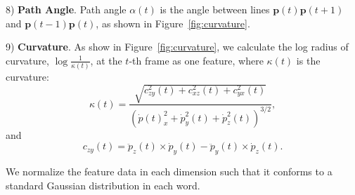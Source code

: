 8) \textbf{Path Angle}.
Path angle $\alpha(t)$ is the angle between lines $\textbf{p}(t)\textbf{p}(t+1)$ and $\textbf{p}(t-1)\textbf{p}(t)$,
as shown in  Figure~\ref{fig:curvature}.


9) \textbf{Curvature}. As show in Figure~\ref{fig:curvature},
we calculate the log radius of curvature,  $\log \frac{1}{\kappa(t)}$, at the $t$-th frame as one feature,  where $\kappa(t)$ is the curvature:
\vspace{-0mm}
$$
\kappa(t)=\frac{\sqrt{c_{zy}^{2}(t)+c_{xz}^{2}(t)+c_{yx}^{2}(t)}}{({\dot{p}}(t)_x^{2}+{\dot{p}}_y^{2}(t)+{\dot{p}}_z^{2}(t))^{3/2}}, $$
and
$$c_{zy}(t) = {\ddot{p}}_z(t) \times {\dot{p}}_y(t)-{\ddot{p}}_y(t) \times {\dot{p}}_z(t). $$


%
%


We normalize the feature data in each dimension  such that it conforms to a standard Gaussian distribution in each word. 


